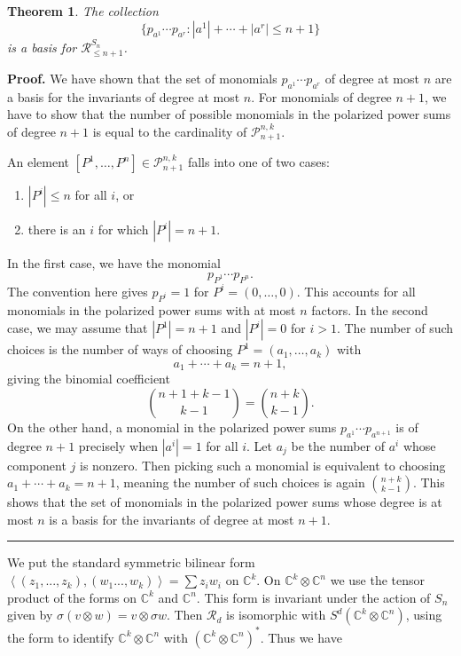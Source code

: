 \documentclass[12pt]{article}%
\newtheorem{theorem}{Theorem}
\newenvironment{proof}[1][Proof]{\noindent\textbf{#1.} }{\ \rule{0.5em}{0.5em}}
\begin{document}
\begin{theorem}
The collection
\[
\{p_{a^{1}}\cdots p_{a^{r}}:|a^{1}|+\cdots+|a^{r}|\leq n+1\}
\]
is a basis for $\mathcal{R}_{\leq n+1}^{S_{n}}$.
\end{theorem}

\begin{proof}
We have shown that the set of monomials $p_{a^{1}}\cdots p_{a^{r}}$ of degree
at most $n$ are a basis for the invariants of degree at most $n$. For
monomials of degree $n+1$, we have to show that the number of possible
monomials in the polarized power sums of degree $n+1$ is equal to the
cardinality of $\mathcal{P}_{n+1}^{n,k}$.

An element $[P^{1},\dots, P^{n}] \in\mathcal{P}^{n,k}_{n+1}$ falls into one of
two cases:

\begin{enumerate}
\item $|P^{i}| \leq n$ for all $i$, or

\item there is an $i$ for which $|P^{i}| =n+1$.
\end{enumerate}

In the first case, we have the monomial
\[
p_{P^{1}}\cdots p_{P^{n}}.
\]
The convention here gives $p_{P^{i}} = 1$ for $P^{i} = (0,\dots, 0)$. This
accounts for all monomials in the polarized power sums with at most $n$
factors. In the second case, we may assume that $|P^{1}|=n+1$ and $|P^{i}|=0$
for $i>1$. The number of such choices is the number of ways of choosing
$P^{1}=(a_{1},\dots,a_{k})$ with
\[
a_{1}+\cdots+a_{k}=n+1,
\]
giving the binomial coefficient
\[
\binom{n+1+k-1}{k-1}=\binom{n+k}{k-1}.
\]
On the other hand, a monomial in the polarized power sums $p_{a^{1}}\cdots
p_{a^{n+1}}$ is of degree $n+1$ precisely when $|a^{i}|=1$ for all $i$. Let
$a_{j}$ be the number of $a^{i}$ whose component $j$ is nonzero. Then picking
such a monomial is equivalent to choosing $a_{1}+\cdots+a_{k}=n+1$, meaning
the number of such choices is again $\binom{n+k}{k-1}$. This shows that the
set of monomials in the polarized power sums whose degree is at most $n$ is a
basis for the invariants of degree at most $n+1$.
\end{proof}

We put the standard symmetric bilinear form $\left\langle (z_{1}%
,...,z_{k}),(w_{1}...,w_{k})\right\rangle =\sum z_{i}w_{i}$ on $\mathbb{C}%
^{k}$. On $\mathbb{C}^{k}\otimes\mathbb{C}^{n}$ we use the tensor product of
the forms on $\mathbb{C}^{k}$ and $\mathbb{C}^{n}$. This form is invariant
under the action of $S_{n}$ given by $\sigma(v\otimes w)=v\otimes\sigma w.$
Then $\mathcal{R}_{d}$ is isomorphic with $S^{d}(\mathbb{C}^{k}\otimes
\mathbb{C}^{n})$, using the form to identify $\mathbb{C}^{k}\otimes
\mathbb{C}^{n}$ with $(\mathbb{C}^{k}\otimes\mathbb{C}^{n})^{\ast}$. Thus we have
\end{document}
